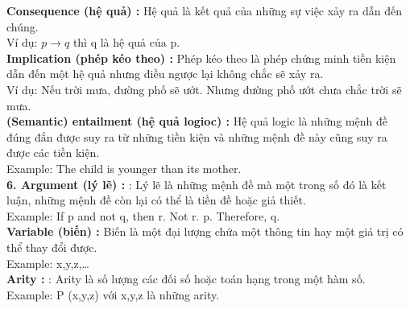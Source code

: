 \documentclass[a4paper]{article}
\begin{document}
\textbf{{\large\hspace{1 cm} Consequence (hệ quả) : }}
{\large Hệ quả là kết quả của những sự việc xảy ra dẫn đến chúng.\\
	
	\hspace{1 cm} Ví dụ: $p \rightarrow q$ thì q là hệ quả của p. }\\

\textbf{{\large\hspace{1 cm} Implication (phép kéo theo) : }}{\large Phép kéo theo là phép chứng minh tiền kiện dẫn đến một hệ quả nhưng điều ngược lại không chắc sẽ xảy ra.\\
	
	\hspace{1 cm} Ví dụ: Nếu trời mưa, đường phố sẽ ướt. Nhưng đường phố ướt chưa chắc trời sẽ mưa.}\\

\textbf{{\large\hspace{1 cm} (Semantic) entailment (hệ quả logioc) : }}
{\large Hệ quả logic là những mệnh đề đúng đắn được suy ra từ những tiền kiện và những mệnh đề này cũng suy ra được các tiền kiện.\\
	
	\hspace{1 cm} Example: The child is younger than its mother.}\\

\textbf{{\large\hspace{0.5 cm} 6. Argument (lý lẽ) :  }}
{\large : Lý lẽ là những mệnh đề mà một trong số đó là kết luận, những mệnh đề còn lại có thể là tiền đề hoặc giả thiết.\\
	
	\hspace{1 cm} Example: If p and not q, then r. Not r. p. Therefore, q.}\\

\textbf{{\large\hspace{1 cm} Variable (biến) : }}
{\large Biến là một đại lượng chứa một thông tin hay một giá trị có thể thay đổi được.\\
	
	\hspace{1 cm} Example: x,y,z,…} \\

\textbf{{\large\hspace{1 cm} Arity :  }}
{\large : Arity là số lượng các đối số hoặc toán hạng trong một hàm số.\\
	
	\hspace{1 cm} Example: P (x,y,z) với x,y,z là những arity.}\\
\end{document}
